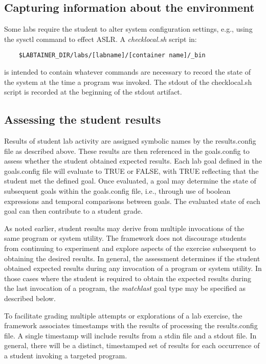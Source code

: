 \documentclass{article}
\begin{document}
\subsection{Capturing information about the environment}
Some labs require the student to alter system configuration settings,
e.g., using the sysctl command to effect ASLR. A \textit{checklocal.sh} script in:
\begin{verbatim}
    $LABTAINER_DIR/labs/[labname]/[container name]/_bin
\end{verbatim}
is intended to contain whatever commands are necessary to record the 
state of the system at the time a program was invoked.  The stdout of
the checklocal.sh script is recorded at the beginning of the stdout artifact. 

\subsection{Assessing the student results}
Results of student lab activity are assigned symbolic names by the results.config file
as described above.  These results are then referenced in the goals.config to assess whether
the student obtained expected results.  Each lab goal defined in the goals.config file
will evaluate to TRUE or FALSE, with TRUE reflecting that the student met the defined goal.
Once evaluated, a goal may determine the state of subsequent goals within the goals.config file, 
i.e., through use of boolean expressions and temporal comparisons between goals.  The evaluated
state of each goal can then contribute to a student grade.

As noted earlier, student results may derive from multiple invocations of the same program or system utility.  
The framework does not discourage students from continuing to experiment and explore aspects of the 
exercise subsequent to obtaining the desired results.  In general, the assessment determines if the student
obtained expected results during any invocation of a program or system utility.  In those cases 
where the student is required to obtain the expected results during the last invocation of a program, 
the \textit{matchlast} goal type may be specified as described below.

To facilitate grading multiple attempts or explorations of a lab exercise, the framework associates
timestamps with the results of processing the results.config file.  A single timestamp will
include results from a stdin file and a stdout file.  In general, there will be a distinct, 
timestamped set of results for each occurrence of a student invoking a targeted program.
\end{document}
